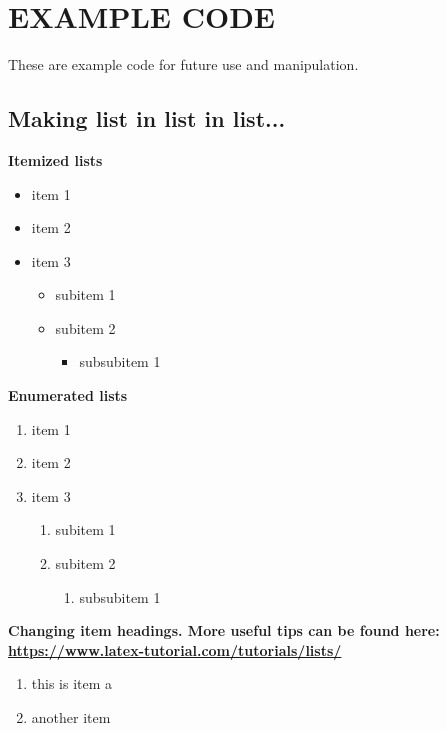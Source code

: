 \documentclass[./main.tex]{subfiles}
\begin{document}
\section*{EXAMPLE CODE}
These are example code for future use and manipulation.

\subsection*{Making list in list in list...}
\textbf{Itemized lists}
\begin{itemize}
\item item 1
\item item 2
\item item 3
	\begin{itemize}
	\item subitem 1
	\item subitem 2
		\begin{itemize}
		\item subsubitem 1
		\end{itemize}
	\end{itemize}
\end{itemize}

\noindent \textbf{Enumerated lists}
\begin{enumerate}
\item item 1
\item item 2
\item item 3
	\begin{enumerate}
	\item subitem 1
	\item subitem 2
		\begin{enumerate}
		\item subsubitem 1
		\end{enumerate}
	\end{enumerate}
\end{enumerate}

\noindent \textbf{Changing item headings. More useful tips can be found here: \url{https://www.latex-tutorial.com/tutorials/lists/}}
\begin{enumerate}[label=\Alph*.]
\item this is item a
\item another item
\end{enumerate}
\end{document}
